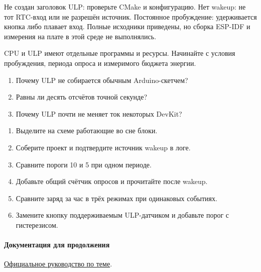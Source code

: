 \begin{trouble}
Не создан заголовок ULP: проверьте CMake и конфигурацию. Нет wakeup: не тот RTC-вход
или не разрешён источник. Постоянное пробуждение: удерживается кнопка либо плавает вход.
Полные исходники приведены, но сборка ESP-IDF и измерения на плате в этой среде не выполнялись.
\end{trouble}
\begin{summary}
CPU и ULP имеют отдельные программы и ресурсы. Начинайте с условия пробуждения,
периода опроса и измеримого бюджета энергии.
\end{summary}

\begin{selfcheck}
\begin{enumerate}
\item Почему ULP не собирается обычным Arduino-скетчем?
\item Равны ли десять отсчётов точной секунде?
\item Почему ULP почти не меняет ток некоторых DevKit?
\end{enumerate}
\end{selfcheck}
\begin{tasks}
\begin{enumerate}
\item {} Выделите на схеме работающие во сне блоки.
\item {} Соберите проект и подтвердите источник wakeup в логе.
\item {} Сравните пороги 10 и 5 при одном периоде.
\item {} Добавьте общий счётчик опросов и прочитайте после wakeup.
\item {} Сравните заряд за час в трёх режимах при одинаковых событиях.
\item {} Замените кнопку поддерживаемым ULP-датчиком и добавьте порог с гистерезисом.
\end{enumerate}
\end{tasks}

\paragraph{Документация для продолжения}\href{https://docs.espressif.com/projects/esp-idf/en/v5.4/esp32s3/api-reference/system/ulp-risc-v.html}{Официальное руководство по теме}.
